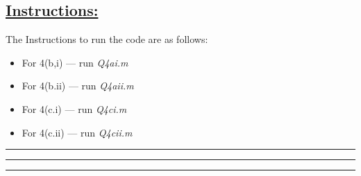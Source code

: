 \newpage\subsection*{\underline{Instructions: }}
The Instructions to run the code are as follows: 
\begin{itemize}
\item For 4(b,i) --- run \emph{Q4ai.m}
\item For 4(b.ii) --- run \emph{Q4aii.m}
\item For 4(c.i) --- run \emph{Q4ci.m}
\item For 4(c.ii) --- run \emph{Q4cii.m}
\end{itemize}\hrule\hrule\hrule
